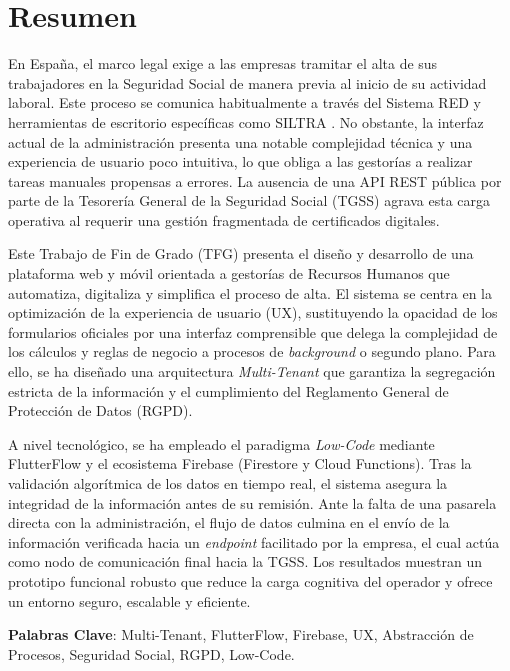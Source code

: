 \chapter*{Resumen} \label{chp:abstract}
En España, el marco legal exige a las empresas tramitar el alta de sus trabajadores en la Seguridad Social de manera previa al inicio de su actividad laboral. Este proceso se comunica habitualmente a través del Sistema RED y herramientas de escritorio específicas como SILTRA \cite{seguridadsocial2026}. No obstante, la interfaz actual de la administración presenta una notable complejidad técnica y una experiencia de usuario poco intuitiva, lo que obliga a las gestorías a realizar tareas manuales propensas a errores. La ausencia de una API REST pública por parte de la Tesorería General de la Seguridad Social (TGSS) agrava esta carga operativa al requerir una gestión fragmentada de certificados digitales.

Este Trabajo de Fin de Grado (TFG) presenta el diseño y desarrollo de una plataforma web y móvil orientada a gestorías de Recursos Humanos que automatiza, digitaliza y simplifica el proceso de alta. El sistema se centra en la optimización de la experiencia de usuario (UX), sustituyendo la opacidad de los formularios oficiales por una interfaz comprensible que delega la complejidad de los cálculos y reglas de negocio a procesos de \textit{background} o segundo plano. Para ello, se ha diseñado una arquitectura \textit{Multi-Tenant} que garantiza la segregación estricta de la información y el cumplimiento del Reglamento General de Protección de Datos (RGPD)\cite{rgpd2016}.

A nivel tecnológico, se ha empleado el paradigma \textit{Low-Code} \cite{lowcode2021richardson} mediante FlutterFlow y el ecosistema Firebase (Firestore y Cloud Functions). Tras la validación algorítmica de los datos en tiempo real, el sistema asegura la integridad de la información antes de su remisión. Ante la falta de una pasarela directa con la administración, el flujo de datos culmina en el envío de la información verificada hacia un \textit{endpoint} facilitado por la empresa, el cual actúa como nodo de comunicación final hacia la TGSS. Los resultados muestran un prototipo funcional robusto que reduce la carga cognitiva del operador y ofrece un entorno seguro, escalable y eficiente.

\textbf{Palabras Clave}: Multi-Tenant, FlutterFlow, Firebase, UX, Abstracción de Procesos, Seguridad Social, RGPD, Low-Code.

\newpage

